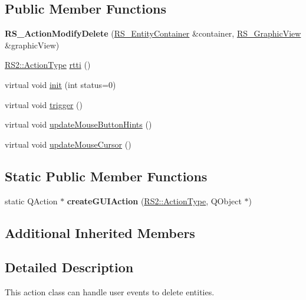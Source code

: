 \subsection*{Public Member Functions}
\begin{DoxyCompactItemize}
\item 
\hypertarget{classRS__ActionModifyDelete_a65448e3a46c79131fb42a62abf5c53c0}{{\bfseries R\-S\-\_\-\-Action\-Modify\-Delete} (\hyperlink{classRS__EntityContainer}{R\-S\-\_\-\-Entity\-Container} \&container, \hyperlink{classRS__GraphicView}{R\-S\-\_\-\-Graphic\-View} \&graphic\-View)}\label{classRS__ActionModifyDelete_a65448e3a46c79131fb42a62abf5c53c0}

\item 
\hyperlink{classRS2_afe3523e0bc41fd637b892321cfc4b9d7}{R\-S2\-::\-Action\-Type} \hyperlink{classRS__ActionModifyDelete_ac306ad6e4b6291b72d267029bd201c16}{rtti} ()
\item 
virtual void \hyperlink{classRS__ActionModifyDelete_a9a7551161f7ef5aae9f0e998d8f4acb0}{init} (int status=0)
\item 
virtual void \hyperlink{classRS__ActionModifyDelete_a6ead31552cabe88617197230fcaa4862}{trigger} ()
\item 
virtual void \hyperlink{classRS__ActionModifyDelete_a038efe0e5d3470c2390f28fb5900c156}{update\-Mouse\-Button\-Hints} ()
\item 
virtual void \hyperlink{classRS__ActionModifyDelete_a656d4d1a2704c53921d8ef5badce9dbc}{update\-Mouse\-Cursor} ()
\end{DoxyCompactItemize}
\subsection*{Static Public Member Functions}
\begin{DoxyCompactItemize}
\item 
\hypertarget{classRS__ActionModifyDelete_ae821126f8bf9dd094bb6a056a9ad510c}{static Q\-Action $\ast$ {\bfseries create\-G\-U\-I\-Action} (\hyperlink{classRS2_afe3523e0bc41fd637b892321cfc4b9d7}{R\-S2\-::\-Action\-Type}, Q\-Object $\ast$)}\label{classRS__ActionModifyDelete_ae821126f8bf9dd094bb6a056a9ad510c}

\end{DoxyCompactItemize}
\subsection*{Additional Inherited Members}


\subsection{Detailed Description}
This action class can handle user events to delete entities.

